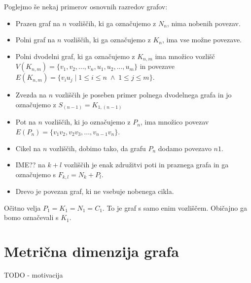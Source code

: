 \documentclass[mat1, tisk]{fmfdelo}
\begin{document}
Poglejmo še nekaj primerov osnovnih razredov grafov:
\begin{itemize} \label{primeri_grafov}
    \item Prazen graf na $n$ vozliščih, ki ga označujemo z $N_n$, nima nobenih povezav. 
    \item Polni graf na $n$ vozliščih, ki ga označujemo z $K_n$, ima vse možne povezave.
    \item Polni dvodelni graf, ki ga označujemo z $K_{n, m}$ ima množico 
    vozlišč $V(K_{n,m}) = \{ v_1, v_2, ... , v_n , u_1, u_2, ... , u_m \}$
    in povezave $E(K_{n, m}) = \{ v_i u_j \; | \;  1 \leq i \leq n \; \land \; 1 \leq j \leq m \}.$ 
    \item Zvezda na $n$ vozliščih je poseben primer polnega dvodelnega grafa in jo označujemo
    z $S_{(n-1)} = K_{1, (n-1)}$
    \item Pot na $n$ vozliščih, ki jo označujemo z $P_n$, ima množico povezav 
    $E(P_n) = \{ v_1 v_2 , v_2 v_3 , ... , v_{n-1} v_n\}.$
    \item Cikel na $n$ vozliščih, dobimo tako, da grafu $P_n$ dodamo povezavo $n 1$.
    \item IME?? na $k+l$ vozliščih je enak združitvi poti in praznega grafa in ga označujemo s 
    $F_{k,l} = N_k + P_l.$
    \item Drevo je povezan graf, ki ne vsebuje nobenega cikla.
\end{itemize}

\begin{opomba}
    Očitno velja $P_1 = K_1 = N_1 = C_1.$ To je graf s samo enim vozliščem. Običajno ga bomo
    označevali s $K_1.$
\end{opomba}




\section{Metrična dimenzija grafa} \label{s:metricna_dim_grafa}

TODO - motivacija

\end{document}
